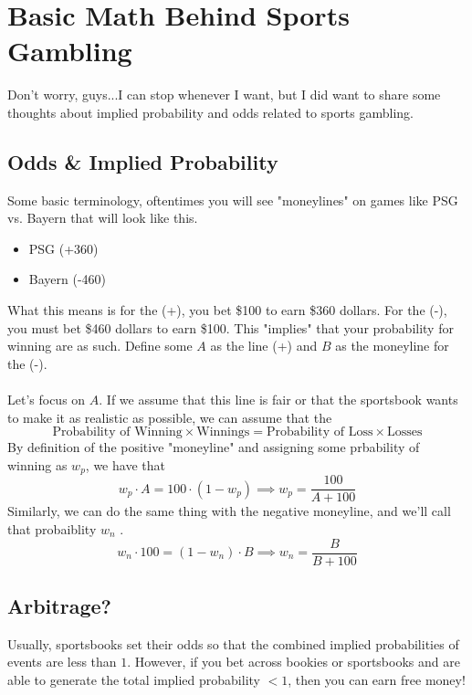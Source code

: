 \section{Basic Math Behind Sports Gambling}
Don't worry, guys...I can stop whenever I want, but I did want to share some thoughts about implied probability and odds related to sports gambling. 

\subsection{Odds & Implied Probability}
Some basic terminology, oftentimes you will see "moneylines" on games like PSG vs. Bayern that will look like this.
\begin{itemize}
    \item PSG (+360)
    \item Bayern (-460)
\end{itemize}
What this means is for the (+), you bet \$100 to earn \$360 dollars. For the (-), you must bet \$460 dollars to earn \$100. 
This "implies" that your probability for winning are as such. Define some $A$ as the line (+) and $B$ as the moneyline for the (-). \\
\\
Let's focus on $A$. 
If we assume that this line is fair or that the sportsbook wants to make it as realistic as possible, we can assume that the 
$$
\text{Probability of Winning} \times \text{Winnings} = \text{Probability of Loss} \times \text{Losses}
$$
By definition of the positive "moneyline" and assigning some prbability of winning as $w_p$, we have that
$$
w_p \cdot A = 100 \cdot (1-w_p) \implies w_p = \frac{100}{A + 100}
$$
Similarly, we can do the same thing with the negative moneyline, and we'll call that probaiblity $w_n$ .
$$
w_n \cdot 100 = (1-w_n) \cdot B \implies w_n = \frac{B}{B + 100}
$$
\subsection{Arbitrage?}
Usually, sportsbooks set their odds so that the combined implied probabilities of events are less than $1$. However, if you bet across bookies or sportsbooks and are able to generate the total implied probability $< 1$, then you can earn free money!
